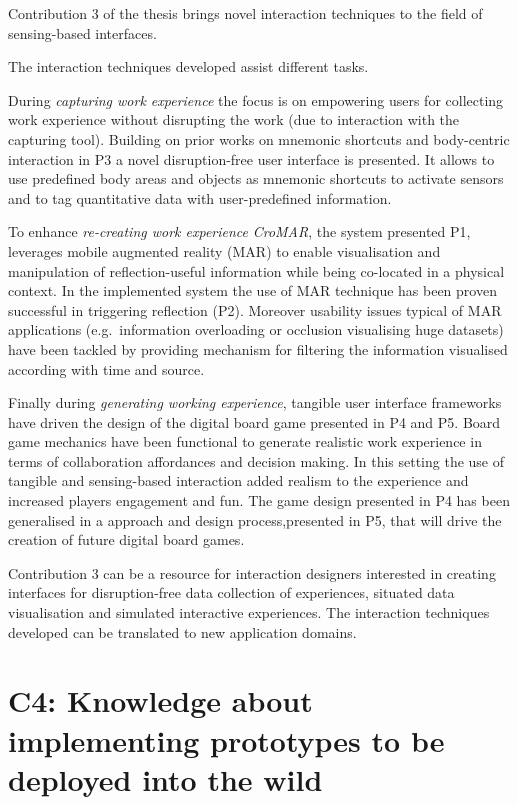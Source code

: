 Contribution 3 of the thesis brings novel interaction techniques to the field of sensing-based interfaces.

The interaction techniques developed assist different tasks.

During \emph{capturing work experience} the focus is on empowering users for collecting work experience without disrupting the work (due to interaction with the capturing tool). Building on prior works on mnemonic shortcuts \autocite{Guerreiro:2008wt} and body-centric interaction \autocite{Chen:2012wk} in P3 a novel disruption-free user interface is presented. It allows to use predefined body areas and objects as mnemonic shortcuts to activate sensors and to tag quantitative data with user-predefined information.

To enhance \emph{re-creating work experience} \emph{CroMAR}, the system presented P1, leverages mobile augmented reality (MAR) to enable visualisation and manipulation of reflection-useful information while being co-located in a physical context. In the implemented system the use of MAR technique has been proven successful in triggering reflection (P2). Moreover usability issues typical of MAR applications (e.g.~information overloading or occlusion visualising huge datasets) have been tackled by providing mechanism for filtering the information visualised according with time and source.

Finally during \emph{generating working experience}, tangible user interface frameworks have driven the design of the digital board game presented in P4 and P5. Board game mechanics have been functional to generate realistic work experience in terms of collaboration affordances and decision making. In this setting the use of tangible and sensing-based interaction added realism to the experience and increased players engagement and fun. The game design presented in P4 has been generalised in a approach and design process,presented in P5, that will drive the creation of future digital board games.

Contribution 3 can be a resource for interaction designers interested in creating interfaces for disruption-free data collection of experiences, situated data visualisation and simulated interactive experiences. The interaction techniques developed can be translated to new application domains.

\section{C4: Knowledge about implementing prototypes to be deployed into the wild}\label{c4-knowledge-about-implementing-prototypes-to-be-deployed-into-the-wild}

